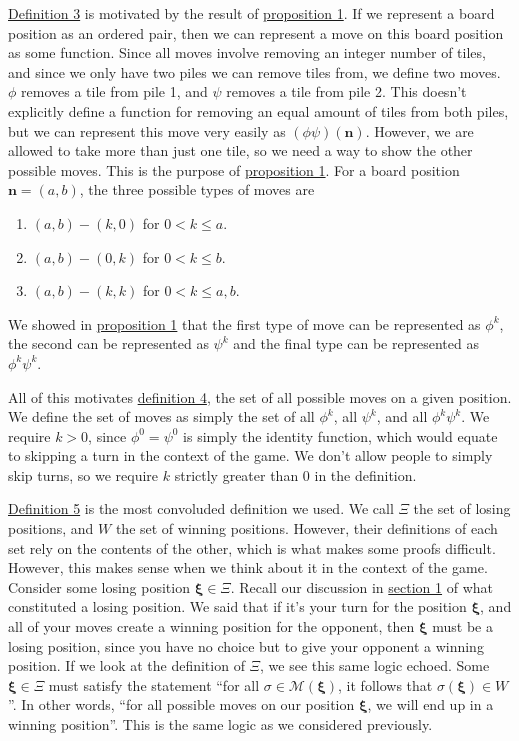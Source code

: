 \documentclass[11pt, letterpaper]{article}
\begin{document}
\hyperref[dfn:3]{Definition 3} is motivated by the result of \hyperref[prp:1]{proposition 1}. If we represent a board position as an ordered pair, then we can represent a move on this board position as some function. Since all moves involve removing an integer number of tiles, and since we only have two piles we can remove tiles from, we define two moves. $\phi $ removes a tile from pile 1, and $\psi $ removes a tile from pile 2. This doesn't explicitly define a function for removing an equal amount of tiles from both piles, but we can represent this move very easily as $(\phi \psi) (\mathbf{n})$. However, we are allowed to take more than just one tile, so we need a way to show the other possible moves. This is the purpose of \hyperref[prp:1]{proposition 1}. For a board position $\mathbf{n}=(a,b)$, the three possible types of moves are
\begin{enumerate}
	\item $(a,b)-(k,0)$ for $0<k\leq a$.
	\item $(a,b)-(0,k)$ for $0<k\leq b$.
	\item $(a,b)-(k,k)$ for $0<k\leq a,b$.
\end{enumerate}
We showed in \hyperref[prp:1]{proposition 1} that the first type of move can be represented as $\phi ^k$, the second can be represented as $\psi ^k$ and the final type can be represented as $\phi ^k\psi ^k$.

All of this motivates \hyperref[dfn:4]{definition 4}, the set of all possible moves on a given position. We define the set of moves as simply the set of all $\phi ^k$, all $\psi ^k$, and all $\phi ^k\psi ^k$. We require $k>0$, since $\phi ^0=\psi ^0$ is simply the identity function, which would equate to skipping a turn in the context of the game. We don't allow people to simply skip turns, so we require $k $ strictly greater than $0$ in the definition.

\hyperref[dfn:5]{Definition 5} is the most convoluded definition we used. We call $\Xi $ the set of losing positions, and $W$ the set of winning positions. However, their definitions of each set rely on the contents of the other, which is what makes some proofs difficult. However, this makes sense when we think about it in the context of the game. Consider some losing position $\boldsymbol{\xi} \in \Xi $. Recall our discussion in \hyperref[sec:1]{section 1} of what constituted a losing position. We said that if it's your turn for the position $\boldsymbol{\xi} $, and all of your moves create a winning position for the opponent, then $\boldsymbol{\xi} $ must be a losing position, since you have no choice but to give your opponent a winning position. If we look at the definition of $\Xi $, we see this same logic echoed. Some $\boldsymbol{\xi} \in \Xi $ must satisfy the statement ``for all $\sigma \in \mathscr{M} (\boldsymbol{\xi} )$, it follows that $\sigma (\boldsymbol{\xi} )\in W$''. In other words, ``for all possible moves on our position $\boldsymbol{\xi} $, we will end up in a winning position''. This is the same logic as we considered previously.
\end{document}
